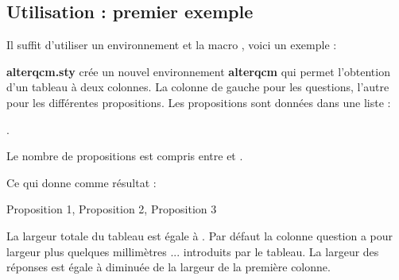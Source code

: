\subsection{Utilisation : premier exemple}

Il suffit d'utiliser un environnement  et la macro , voici un exemple :


 \noindent
\begin{minipage}[c][][t]{.40\linewidth}  
\end{minipage}\hfill \noindent  
\begin{minipage}[c][][b]{.50\linewidth}
\textbf{alterqcm.sty} crée un nouvel environnement \textbf{alterqcm} qui permet l'obtention d'un tableau à deux colonnes. La colonne de gauche pour les questions, l'autre pour les différentes propositions.  Les propositions sont données dans une liste :

.

 Le nombre de propositions est compris entre  et .
\end{minipage}

\medskip
Ce qui donne comme résultat :

\bigskip
  \begin{alterqcm}
  {%
  {Proposition 1},
  {Proposition 2},
  {Proposition 3}%
  }
  \end{alterqcm}

\medskip
 La largeur totale du tableau est égale à . Par défaut la  colonne question a pour largeur \tkzname{100mm} plus quelques millimètres ... introduits par le tableau. La largeur des réponses est égale à  diminuée de la largeur de la première colonne. 

